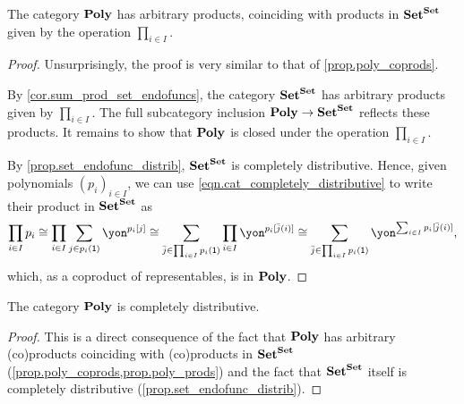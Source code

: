 \documentclass[Book-Poly]{subfiles}
\begin{document}
\begin{proposition}\label{prop.poly_prods}
The category $\mathbf{Poly}$ has arbitrary products, coinciding with products in $\mathbf{Set}^{\mathbf{Set}}$ given by the operation $\prod_{i \in I}$.
\end{proposition}
\begin{proof}
Unsurprisingly, the proof is very similar to that of \cref{prop.poly_coprods}.

By \cref{cor.sum_prod_set_endofuncs}, the category $\mathbf{Set}^{\mathbf{Set}}$ has arbitrary products given by $\prod_{i \in I}$.
The full subcategory inclusion $\mathbf{Poly} \to \mathbf{Set}^{\mathbf{Set}}$ reflects these products.
It remains to show that $\mathbf{Poly}$ is closed under the operation $\prod_{i \in I}$.

By \cref{prop.set_endofunc_distrib}, $\mathbf{Set}^{\mathbf{Set}}$ is completely distributive.
Hence, given polynomials $(p_i)_{i \in I}$, we can use \eqref{eqn.cat_completely_distributive} to write their product in $\mathbf{Set}^{\mathbf{Set}}$ as
\begin{equation} \label{eqn.poly_prod}
    \prod_{i \in I} p_i \iso \prod_{i \in I} \sum_{j \in p_i(\1)} \yon^{p_i[j]} \iso \sum_{\bar{j} \in \prod_{i \in I} p_i(\1)} \prod_{i \in I} \yon^{p_i[\bar{j}(i)]} \iso \sum_{\bar{j} \in \prod_{i \in I} p_i(\1)} \yon^{\sum_{i \in I} p_i[\bar{j}(i)]},
\end{equation}
which, as a coproduct of representables, is in $\mathbf{Poly}$.
\end{proof}

\begin{corollary} \label{prop.poly_completely_distributive}
The category $\mathbf{Poly}$ is completely distributive.
\end{corollary}
\begin{proof}
This is a direct consequence of the fact that $\mathbf{Poly}$ has arbitrary (co)products coinciding with (co)products in $\mathbf{Set}^{\mathbf{Set}}$ (\cref{prop.poly_coprods,prop.poly_prods}) and the fact that $\mathbf{Set}^{\mathbf{Set}}$ itself is completely distributive (\cref{prop.set_endofunc_distrib}).
\end{proof}
\end{document}
